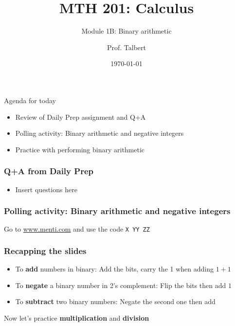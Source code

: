 \documentclass{beamer}
\title{MTH 201: Calculus}
\subtitle{Module 1B: Binary arithmetic}
\author{Prof. Talbert}
\institute{GVSU}
\date{\today}
\begin{document}
\frame{\titlepage}


\begin{frame}{Agenda for today}
    \begin{itemize}
        \item<1-> Review of Daily Prep assignment and Q+A
        \item<2-> Polling activity: Binary arithmetic and negative integers 
        \item<3-> Practice with performing binary arithmetic 
    \end{itemize}
\end{frame}

\begin{frame}
    \frametitle{Q+A from Daily Prep}

    \begin{itemize}
        \item Insert questions here 
    \end{itemize}

\end{frame}


\begin{frame}
    \frametitle{Polling activity: Binary arithmetic and negative integers}

    \begin{center}
        Go to \url{www.menti.com} and use the code \texttt{X YY ZZ}
    \end{center}
    

\end{frame}

\begin{frame}
    \frametitle{Recapping the slides}

    \begin{itemize}
        \item<1-> To \textbf{add} numbers in binary: Add the bits, carry the 1 when adding $1+1$
        \item<2-> To \textbf{negate} a binary number in 2's complement: Flip the bits then add $1$
        \item<3-> To \textbf{subtract} two binary numbers: Negate the second one then add 
    \end{itemize}
    
Now let's practice \textbf{multiplication} and \textbf{division}

\end{frame}
\end{document}
